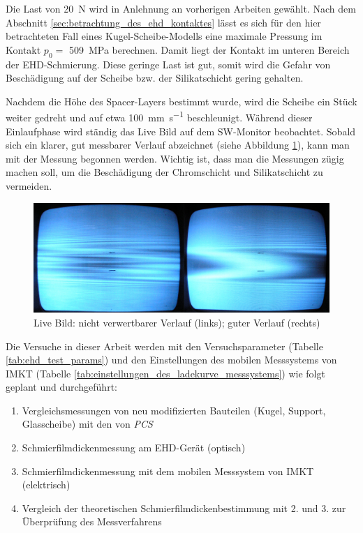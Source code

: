Die Last von \SI{20}{\newton} wird in Anlehnung an vorherigen Arbeiten gewählt.
Nach dem Abschnitt \ref{sec:betrachtung_des_ehd_kontaktes} lässt es sich für den hier betrachteten Fall eines Kugel-Scheibe-Modells eine maximale Pressung im Kontakt $p_0 =$ \SI{509}{\mega\pascal} berechnen.
Damit liegt der Kontakt im unteren Bereich der EHD-Schmierung.
Diese geringe Last ist gut, somit wird die Gefahr von Beschädigung auf der Scheibe bzw. der Silikatschicht gering gehalten.

Nachdem die Höhe des Spacer-Layers bestimmt wurde, wird die Scheibe ein Stück weiter gedreht und auf etwa \SI[per-mode=symbol]{100}{\mm\per\second} beschleunigt.
Während dieser Einlaufphase wird ständig das Live Bild auf dem SW-Monitor beobachtet.
Sobald sich ein klarer, gut messbarer Verlauf abzeichnet (siehe Abbildung \ref{fig:ehd_live_bild}), kann man mit der Messung begonnen werden.
Wichtig ist, dass man die Messungen zügig machen soll, um die Beschädigung der Chromschicht und Silikatschicht zu vermeiden.
\begin{figure}[htb]
    \centering
    \includegraphics[width=0.8\linewidth]{./images/ehd_live_bild.jpg}
    \caption{Live Bild: nicht verwertbarer Verlauf (links); guter Verlauf (rechts)}
    \label{fig:ehd_live_bild}
\end{figure}

Die Versuche in dieser Arbeit werden mit den Versuchsparameter (Tabelle \ref{tab:ehd_test_params}) und den Einstellungen des mobilen Messsystems von IMKT (Tabelle \ref{tab:einstellungen_des_ladekurve_messsystems}) wie folgt geplant und durchgeführt:
\begin{enumerate}
    \item Vergleichsmessungen von neu modifizierten Bauteilen (Kugel, Support, Glasscheibe) mit den von \textit{PCS}
    \item Schmierfilmdickenmessung am EHD-Gerät (optisch)
    \item Schmierfilmdickenmessung mit dem mobilen Messsystem von IMKT (elektrisch)
    \item Vergleich der theoretischen Schmierfilmdickenbestimmung mit 2. und 3. zur Überprüfung des Messverfahrens
\end{enumerate}

